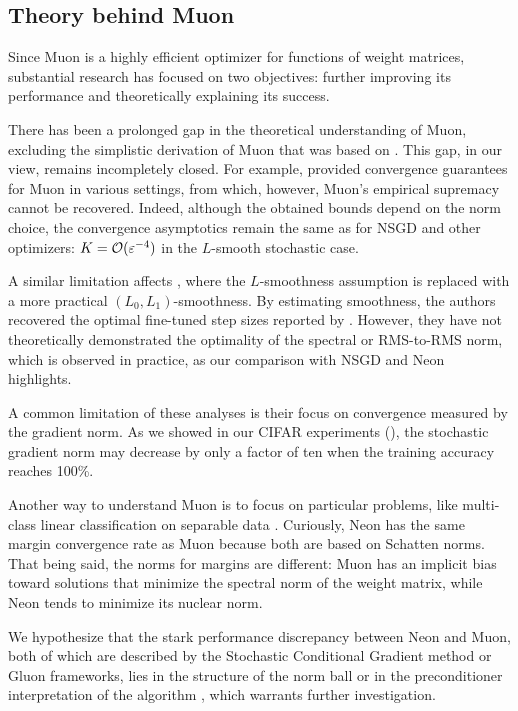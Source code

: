 \documentclass[pmlr]{jmlr}%
\renewcommand{\epsilon}{\varepsilon}
\begin{document}
 \subsection{Theory behind Muon}
 Since Muon \citep{jordan2024muon} is a highly efficient optimizer for functions of weight matrices, substantial research has focused on two objectives: further improving its performance and theoretically explaining its success.
 
 There has been a prolonged gap in the theoretical understanding of Muon, excluding the simplistic derivation of Muon \citep{bernstein2025deriving} that was based on \citep{bernstein2024oldoptimizernewnorm}. This gap, in our view, remains incompletely closed. For example, \citep{kovalev2025understanding} provided convergence guarantees for Muon in various settings, from which, however, Muon's empirical supremacy cannot be recovered. Indeed, although the obtained bounds depend on the norm choice, the convergence asymptotics remain the same as for NSGD and other optimizers: $K = \cO(\epsilon^{-4})$ in the $L$-smooth stochastic case.
 
 A similar limitation affects \citep{riabinin2025gluon}, where the $L$-smoothness assumption is replaced with a more practical $(L_0, L_1)$-smoothness. By estimating smoothness, the authors recovered the optimal fine-tuned step sizes reported by \citep{pethick2025training}. However, they have not theoretically demonstrated the optimality of the spectral or RMS-to-RMS norm, which is observed in practice, as our comparison with NSGD and Neon highlights.
 
 A common limitation of these analyses is their focus on convergence measured by the gradient norm. As we showed in our CIFAR experiments (), the stochastic gradient norm may decrease by only a factor of ten when the training accuracy reaches 100\%.
 
 Another way to understand Muon is to focus on particular problems, like multi-class linear classification on separable data \citep{fan2025implicit}. Curiously, Neon has the same margin convergence rate as Muon because both are based on Schatten norms. That being said, the norms for margins are different: Muon has an implicit bias toward solutions that minimize the spectral norm of the weight matrix, while Neon tends to minimize its nuclear norm.

 We hypothesize that the stark performance discrepancy between Neon and Muon, both of which are described by the Stochastic Conditional Gradient method \citep{pethick2025training} or Gluon frameworks, lies in the structure of the norm ball or in the preconditioner interpretation of the algorithm \citep{pethick2025trainingneuralnetworksscale}, which warrants further investigation.
\end{document}
